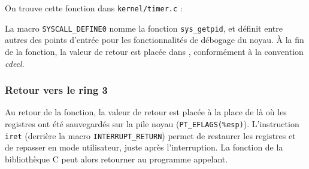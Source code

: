 On trouve cette fonction dans \texttt{kernel/timer.c} :


La macro \texttt{SYSCALL_DEFINE0} nomme la fonction \texttt{sys\_getpid}, et
définit entre autres des points d'entrée pour les fonctionnalités de débogage du
noyau. À la fin de la fonction, la valeur de retour est placée dans \eax,
conformément à la convention \emph{cdecl}.

\subsubsection{Retour vers le ring 3}

Au retour de la fonction, la valeur de retour est placée à la place de \eax là
où les registres ont été sauvegardés sur la pile noyau
(\texttt{PT\_EFLAGS(\%esp)}). L'instruction \texttt{iret} (derrière la macro
\texttt{INTERRUPT\_RETURN}) permet de restaurer les registres et de repasser en
mode utilisateur, juste après l'interruption. La fonction de la bibliothèque C
peut alors retourner au programme appelant.

